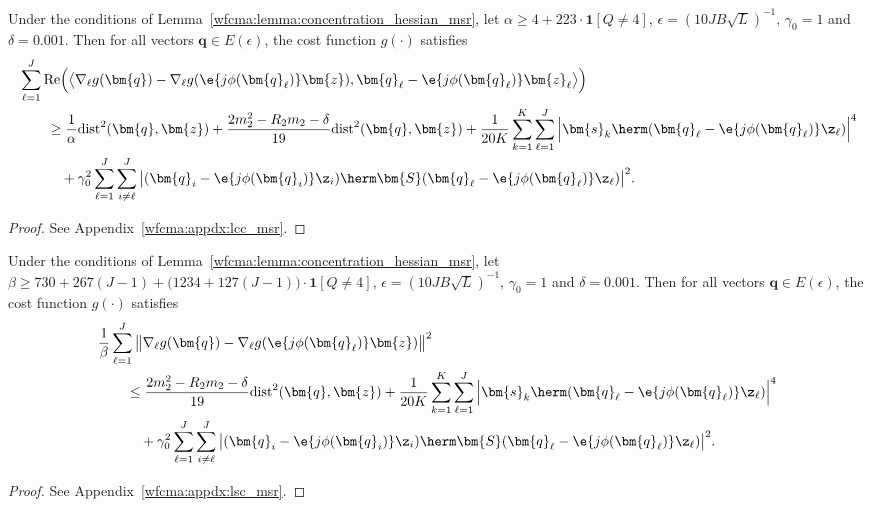 \begin{lem} \label{wfcma:lem:lcc_msr}
Under the conditions of Lemma~\ref{wfcma:lemma:concentration_hessian_msr}, let $\alpha\geq4+223\cdot\bm{1}[Q\neq4]$, $\epsilon=(10JB\sqrt{L})^{-1}$, $\gamma_0=1$ and $\delta=0.001$. Then for all vectors $\bm{q}\in E(\epsilon)$, the cost function $g(\cdot)$ satisfies
\begin{align}
	&\sum_{\ell=1}^J\mathrm{Re}\Big( \big\langle\nabla_{\ell} g(\bm{q})-\nabla_{\ell} g(\e{j\phi(\bm{q}_{\ell})}\bm{z}), \bm{q}_{\ell} - \e{j\phi(\bm{q}_{\ell})}\bm{z}_{\ell}\big\rangle\Big) \nonumber\\
	&\qquad\geq\frac{1}{\alpha}\mathrm{dist}^2(\bm{q},\bm{z})+\frac{2  m_2^2-R_2  m_2-\delta}{19}\mathrm{dist}^2(\bm{q},\bm{z}) 
	+ \frac{1}{20 K}\sum_{k=1}^K\sum_{\ell=1}^J \Big|\bm{s}_k\herm(\bm{q}_{\ell} - \e{j\phi(\bm{q}_{\ell})}\z_{\ell})\Big|^4
	\nonumber\\&\qquad\quad
	+\gamma_0^2\sum_{\ell=1}^J\sum_{i\neq \ell}^J\big|(\bm{q}_i - \e{j\phi(\bm{q}_i)}\z_i)\herm\bm{S}(\bm{q}_{\ell} - \e{j\phi(\bm{q}_{\ell})}\z_{\ell})\big|^2.\label{wfcma:eqn:llc_msr}
\end{align}  
\end{lem}
\begin{proof}
	See Appendix~\ref{wfcma:appdx:lcc_msr}.
\end{proof} 

\begin{lem} \label{wfcma:lem:lsc_msr}
Under the conditions of Lemma~\ref{wfcma:lemma:concentration_hessian_msr}, let  $\beta\geq 730+267(J-1)+\big(1234+127(J-1)\big)\cdot\bm{1}[Q\neq4]$, $\epsilon=(10JB\sqrt{L})^{-1}$, $\gamma_0=1$ and $\delta=0.001$. Then for all vectors $\bm{q}\in E(\epsilon)$, the cost function $g(\cdot)$ satisfies
\begin{align}
	&\frac{1}{\beta}\sum_{\ell=1}^J\big\|\nabla_{\ell} g(\bm{q})-\nabla_{\ell} g(\e{j\phi(\bm{q}_{\ell})}\bm{z})\big\|^2
	\nonumber\\&\qquad
	\leq \frac{2  m_2^2-R_2  m_2-\delta}{19}\mathrm{dist}^2(\bm{q},\bm{z})
	+ \frac{1}{20 K}\sum_{k=1}^K\sum_{\ell=1}^J \Big|\bm{s}_k\herm(\bm{q}_{\ell} - \e{j\phi(\bm{q}_{\ell})}\z_{\ell})\Big|^4
	\nonumber\\&\qquad\quad
	+\gamma_0^2\sum_{\ell=1}^J\sum_{i\neq \ell}^J\big|(\bm{q}_i - \e{j\phi(\bm{q}_i)}\z_i)\herm\bm{S}(\bm{q}_{\ell} - \e{j\phi(\bm{q}_{\ell})}\z_{\ell})\big|^2. \label{wfcma:eqn:lsc_msr}
\end{align}
\end{lem}
\begin{proof}
	See Appendix~\ref{wfcma:appdx:lsc_msr}.
\end{proof} 

